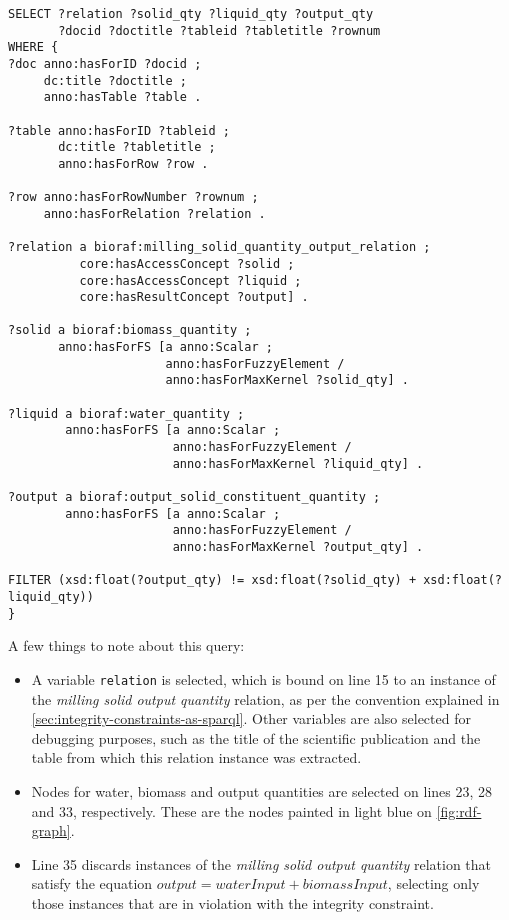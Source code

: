 \documentclass[a4paper, 10pt]{article}
\newcommand{\code}[1]{\texttt{#1}}
\begin{document}
\begin{minipage}{\textwidth}
\begin{lstlisting}[label={lst:sparql-query},
                   caption={A SPARQL query implementing an integrity
                            constraint.}]
SELECT ?relation ?solid_qty ?liquid_qty ?output_qty
       ?docid ?doctitle ?tableid ?tabletitle ?rownum
WHERE {
?doc anno:hasForID ?docid ;
     dc:title ?doctitle ;
     anno:hasTable ?table .

?table anno:hasForID ?tableid ;
       dc:title ?tabletitle ;
       anno:hasForRow ?row .

?row anno:hasForRowNumber ?rownum ;
     anno:hasForRelation ?relation .

?relation a bioraf:milling_solid_quantity_output_relation ;
          core:hasAccessConcept ?solid ;
          core:hasAccessConcept ?liquid ;
          core:hasResultConcept ?output] .

?solid a bioraf:biomass_quantity ;
       anno:hasForFS [a anno:Scalar ;
                      anno:hasForFuzzyElement /
                      anno:hasForMaxKernel ?solid_qty] .

?liquid a bioraf:water_quantity ;
        anno:hasForFS [a anno:Scalar ;
                       anno:hasForFuzzyElement /
                       anno:hasForMaxKernel ?liquid_qty] .

?output a bioraf:output_solid_constituent_quantity ;
        anno:hasForFS [a anno:Scalar ;
                       anno:hasForFuzzyElement /
                       anno:hasForMaxKernel ?output_qty] .

FILTER (xsd:float(?output_qty) != xsd:float(?solid_qty) + xsd:float(?liquid_qty))
}
\end{lstlisting}
\end{minipage}

A few things to note about this query:

\begin{itemize}
  \item A variable \code{relation} is selected, which is bound on line 15 to an
    instance of the \textit{milling solid output quantity} relation, as per the
    convention explained in \autoref{sec:integrity-constraints-as-sparql}.
    Other variables are also selected for debugging purposes, such as the title
    of the scientific publication and the table from which this relation
    instance was extracted.

  \item Nodes for water, biomass and output quantities are selected on lines
    23, 28 and 33, respectively. These are the nodes painted in light blue on
    \autoref{fig:rdf-graph}.

  \item Line 35 discards instances of the \textit{milling solid output
    quantity} relation that satisfy the equation $output = waterInput +
    biomassInput$, selecting only those instances that are in violation with
    the integrity constraint.
\end{itemize}
\end{document}
